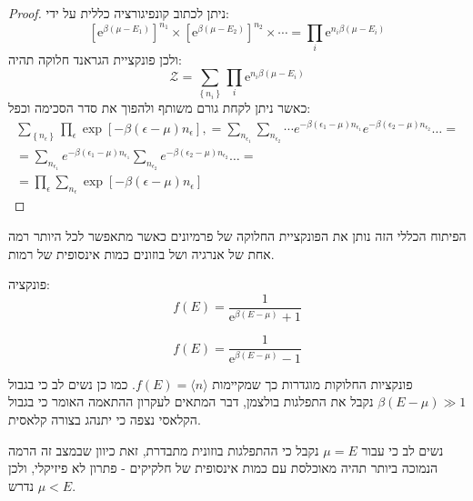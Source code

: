 \documentclass{tstextbook}
\begin{document}
\begin{proof}
ניתן לכתוב קונפיגורציה כללית על ידי:
$$\left[\mathrm{e}^{\beta(\mu-E_{1})}\right]^{n_{1}}\times\left[\mathrm{e}^{\beta(\mu-E_{2})}\right]^{n_{2}}\times\cdots=\prod_{i}\mathrm{e}^{n_{i}\beta(\mu-E_{i})}$$
ולכן פונקציית הגראנד חלוקה תהיה:
$${\mathcal{Z}}=\sum_{\left\{n_{i}\right\}}\prod_{i}\mathrm{e}^{n_{i}\beta(\mu-E_{i})}$$
כאשר ניתן לקחת גורם משותף ולהפוך את סדר הסכימה וכפל:
\begin{gather*}\sum_{\left\{ n_{\epsilon} \right\}}\prod_{\epsilon}\exp\left[ -\beta\left( \epsilon-\mu \right)n_{\epsilon} \right],=\sum_{n_{\epsilon_{1}}}\sum_{n_{\epsilon_{2}}}\cdots e^{-\beta\left( \epsilon_{1}-\mu \right)n_{\epsilon_{1}}}e^{-\beta\left( \epsilon_{2}-\mu \right)n_{\epsilon_{2}}}\ldots=\\=\sum_{n_{\epsilon_{1}}}e^{-\beta\left( \epsilon_{1}-\mu \right)n_{\epsilon_{1}}}\sum_{n_{\epsilon_{2}}}e^{-\beta\left( \epsilon_{2}-\mu \right)n_{\epsilon_{2}}}\ldots =\\=\prod_{\epsilon}\sum_{n_{\epsilon}}\exp\left[ -\beta\left( \epsilon-\mu \right)n_{\epsilon} \right] 
\end{gather*}

\end{proof}
\begin{remark}
הפיתוח הכללי הזה נותן את הפונקציית החלוקה של פרמיונים כאשר מתאפשר לכל היותר רמה אחת של אנרגיה ושל בוזונים כמות אינסופית של רמות.

\end{remark}
\begin{definition}
פונקציה:
$$f(E)=\frac{1}{\mathrm{e}^{\beta(E-\mu)}+1}$$

\end{definition}
\begin{definition}
$$f(E)=\frac{1}{\mathrm{e}^{\beta(E-\mu)}-1}$$

\end{definition}
\begin{remark}
פונקציות החלוקות מוגדרות כך שמקיימות \(f(E)=\langle n \rangle\). כמו כן נשים לב כי בגבול \(\beta\left( E-\mu \right)\gg 1\) נקבל את התפלגות בולצמן, דבר המתאים לעקרון ההתאמה האומר כי בגבול הקלאסי נצפה כי יתנהג בצורה קלאסית.

\end{remark}
\begin{remark}
נשים לב כי עבור \(\mu=E\) נקבל כי ההתפלגות בוזונית מתבדרת, זאת כיוון שבמצב זה הרמה הנמוכה ביותר תהיה מאוכלסת עם כמות אינסופית של חלקיקים - פתרון לא פיזיקלי, ולכן נדרש \(\mu< E\).

\end{remark}
\end{document}
